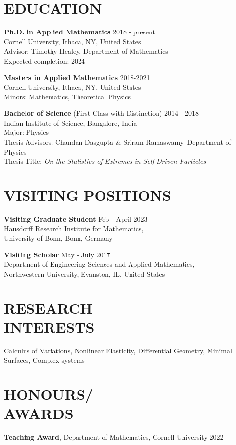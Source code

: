 \documentclass[margin]{res} %
\begin{document}
\begin{resume}

\section{EDUCATION}  
\textbf{Ph.D. in Applied Mathematics} \hfill 2018 - present\\
Cornell University, Ithaca, NY, United States\\
Advisor: Timothy Healey, Department of Mathematics\\
Expected completion: 2024
\smallskip

\textbf{Masters in Applied Mathematics} \hfill 2018-2021\\
Cornell University, Ithaca, NY, United States\\
Minors: Mathematics, Theoretical Physics
\smallskip

\textbf{Bachelor of Science} (First Class with Distinction) \hfill 2014 - 2018 \\
Indian Institute of Science, Bangalore, India\\
Major: Physics\\
Thesis Advisors: Chandan Dasgupta \& Sriram Ramaswamy, Department of Physics\\
Thesis Title: \textit{On the Statistics of Extremes in Self-Driven Particles}

\section{VISITING POSITIONS}
\textbf{Visiting Graduate Student} \hfill Feb - April 2023\\
Hausdorff Research Institute for Mathematics,\\
University of Bonn, Bonn, Germany
\smallskip

\textbf{Visiting Scholar} \hfill May - July 2017\\
Department of Engineering Sciences and Applied Mathematics,\\
Northwestern University, Evanston, IL, United States

\section{RESEARCH \\ INTERESTS} 

Calculus of Variations, Nonlinear Elasticity, Differential Geometry, Minimal Surfaces, Complex systems 
 
\section{HONOURS/\\AWARDS}
{\bf Teaching Award}, Department of Mathematics, Cornell University \hfill2022 


\end{resume}
\end{document}
